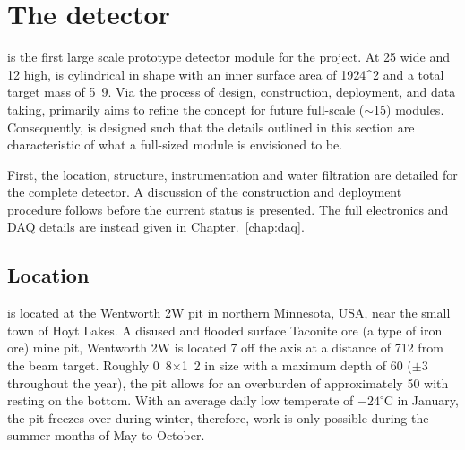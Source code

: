 \section{The \chipsfive detector} %
\label{sec:chips_detector} %

\chipsfive is the first large scale prototype detector module for the \chips project. At
\unit{25}{} wide and \unit{12}{} high, \chipsfive is cylindrical in shape with
an inner surface area of \unit{1924}{^2} and a total target mass of
\unit{5.9}{}. Via the process of design, construction, deployment, and data taking,
\chipsfive primarily aims to refine the \chips concept for future full-scale
($\sim$\unit{15}{}) modules. Consequently, \chipsfive is designed such that the
details outlined in this section are characteristic of what a full-sized \chips module is
envisioned to be.

First, the location, structure, instrumentation and water filtration are detailed for the complete
detector. A discussion of the construction and deployment procedure follows before the current
status is presented. The full electronics and DAQ details are instead given in
Chapter.~\ref{chap:daq}.

\subsection{Location} %
\label{sec:chips_detector_location} %

\chipsfive is located at the Wentworth 2W pit in northern Minnesota, USA, near the small town of
Hoyt Lakes. A disused and flooded surface Taconite ore (a type of iron ore) mine pit, Wentworth 2W
is located \unit{7}{} off the \numi axis at a distance of \unit{712}{}
from the beam target. Roughly \unit{0.8}{}$\times$\unit{1.2}{} in size with
a maximum depth of \unit{60}{} ($\pm$\unit{3}{} throughout the year), the pit
allows for an overburden of approximately \unit{50}{} with \chipsfive resting on the
bottom. With an average daily low temperate of $-24^{\circ}\mathrm{C}$ in January, the pit freezes
over during winter, therefore, work is only possible during the summer months of May to October.

